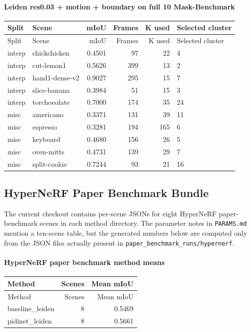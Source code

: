 \documentclass[10pt]{article}
\begin{document}
\paragraph{Leiden res0.03 + motion + boundary on full 10 Mask-Benchmark}
\small
\begin{longtable}{llrrrl}
\toprule
Split & Scene & mIoU & Frames & K used & Selected cluster \\
\midrule
\endfirsthead
\toprule
Split & Scene & mIoU & Frames & K used & Selected cluster \\
\midrule
\endhead
interp & chickchicken & 0.4501 & 97 & 22 & 4 \\
interp & cut-lemon1 & 0.5626 & 399 & 13 & 2 \\
interp & hand1-dense-v2 & 0.9027 & 295 & 15 & 7 \\
interp & slice-banana & 0.3984 & 51 & 15 & 3 \\
interp & torchocolate & 0.7000 & 174 & 35 & 24 \\
misc & americano & 0.3371 & 131 & 39 & 11 \\
misc & espresso & 0.3281 & 194 & 165 & 6 \\
misc & keyboard & 0.4680 & 156 & 26 & 5 \\
misc & oven-mitts & 0.4731 & 139 & 29 & 7 \\
misc & split-cookie & 0.7244 & 93 & 21 & 16 \\
\bottomrule
\end{longtable}
\normalsize

\subsection{HyperNeRF Paper Benchmark Bundle}
The current checkout contains per-scene JSONs for eight HyperNeRF paper-benchmark scenes in each method directory.  The parameter notes in \texttt{PARAMS.md} mention a ten-scene table, but the generated numbers below are computed only from the JSON files actually present in \texttt{paper\_benchmark\_runs/hypernerf}.
\paragraph{HyperNeRF paper benchmark method means}
\small
\begin{longtable}{lrr}
\toprule
Method & Scenes & Mean mIoU \\
\midrule
\endfirsthead
\toprule
Method & Scenes & Mean mIoU \\
\midrule
\endhead
baseline\_leiden & 8 & 0.5469 \\
pidinet\_leiden & 8 & 0.5661 \\
\bottomrule
\end{longtable}
\normalsize
\end{document}
